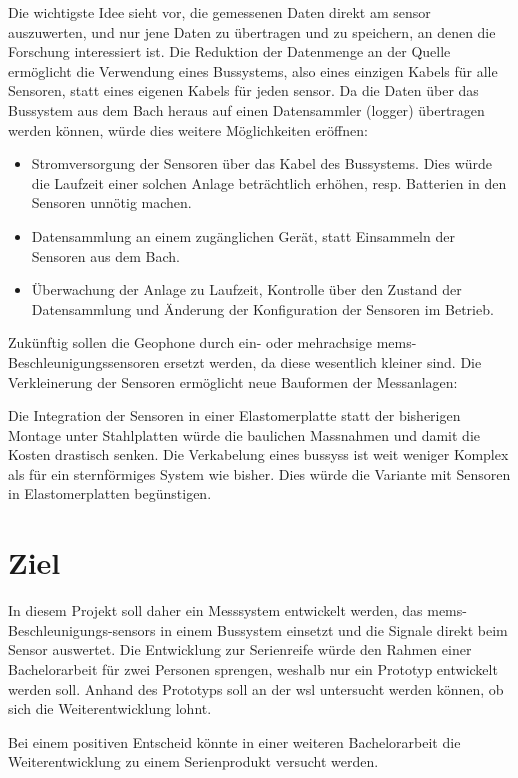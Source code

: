 Die wichtigste Idee sieht vor, die gemessenen Daten direkt am \gls{sensor} auszuwerten, und nur jene Daten zu übertragen und zu speichern, an denen die Forschung interessiert ist. Die Reduktion der Datenmenge an der Quelle ermöglicht die Verwendung eines Bussystems, also eines einzigen Kabels für alle Sensoren, statt eines eigenen Kabels für jeden \gls{sensor}. Da die Daten über das Bussystem aus dem Bach heraus auf einen Datensammler (\gls{logger}) übertragen werden können, würde dies weitere Möglichkeiten eröffnen:
\begin{itemize}
\item Stromversorgung der Sensoren über das Kabel des Bussystems. Dies würde die Laufzeit einer solchen Anlage beträchtlich erhöhen, resp. Batterien in den Sensoren unnötig machen.
\item Datensammlung an einem zugänglichen Gerät, statt Einsammeln der Sensoren aus dem Bach.
\item Überwachung der Anlage zu Laufzeit, Kontrolle über den Zustand der Datensammlung und Änderung der Konfiguration der Sensoren im Betrieb.
\end{itemize}

Zukünftig sollen die Geophone durch ein- oder mehrachsige \gls{mems}-Beschleunigungssensoren ersetzt werden, da diese wesentlich kleiner sind. Die Verkleinerung der Sensoren ermöglicht neue Bauformen der Messanlagen:

Die Integration der Sensoren in einer Elastomerplatte statt der bisherigen Montage unter Stahlplatten würde die baulichen Massnahmen und damit die Kosten drastisch senken. Die Verkabelung eines \gls{bussys}s ist weit weniger Komplex als für ein sternförmiges System wie bisher. Dies würde die Variante mit Sensoren in Elastomerplatten begünstigen.

\section{Ziel}
In diesem Projekt soll daher ein Messsystem entwickelt werden, das \gls{mems}-Beschleunigungs-\glspl{sensor} in einem Bussystem einsetzt und die Signale direkt beim Sensor auswertet. Die Entwicklung zur Serienreife würde den Rahmen einer Bachelorarbeit für zwei Personen sprengen, weshalb nur ein Prototyp entwickelt werden soll. Anhand des Prototyps soll an der \gls{wsl} untersucht werden können, ob sich die Weiterentwicklung lohnt. 

Bei einem positiven Entscheid könnte in einer weiteren Bachelorarbeit die Weiterentwicklung zu einem Serienprodukt versucht werden.

